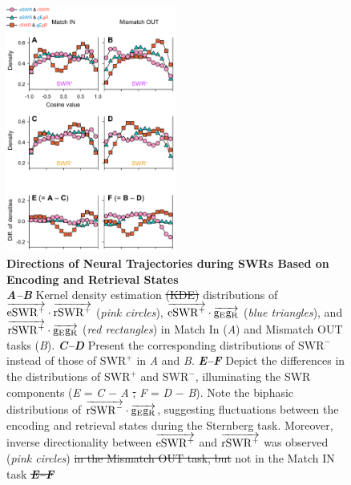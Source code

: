 \documentclass[final,3p,times,twocolumn]{elsarticle}
\providecommand{\DIFaddtex}[1]{{\protect\color{blue}\uwave{#1}}} %
\providecommand{\DIFdeltex}[1]{{\protect\color{red}\sout{#1}}}                      %
\providecommand{\DIFaddFL}[1]{\DIFadd{#1}} %
\providecommand{\DIFdelFL}[1]{\DIFdel{#1}} %
\providecommand{\DIFaddbeginFL}{} %
\providecommand{\DIFaddendFL}{} %
\providecommand{\DIFdelbeginFL}{} %
\providecommand{\DIFdelendFL}{} %
\providecommand{\DIFadd}[1]{\texorpdfstring{\DIFaddtex{#1}}{#1}} %
\providecommand{\DIFdel}[1]{\texorpdfstring{\DIFdeltex{#1}}{}} %
\newcommand{\DIFscaledelfig}{0.5}
\newlength{\DIFdelgraphicswidth} %
\newlength{\DIFdelgraphicsheight} %
\newcommand{\DIFaddincludegraphics}[2][]{{\color{blue}\fbox{\DIFOincludegraphics[#1]{#2}}}} %
\newcommand{\DIFdelincludegraphics}[2][]{%
\sbox{\DIFdelgraphicsbox}{\DIFOincludegraphics[#1]{#2}}%
\settoboxwidth{\DIFdelgraphicswidth}{\DIFdelgraphicsbox} %
\settoboxtotalheight{\DIFdelgraphicsheight}{\DIFdelgraphicsbox} %
\scalebox{\DIFscaledelfig}{%
\parbox[b]{\DIFdelgraphicswidth}{\usebox{\DIFdelgraphicsbox}\\[-\baselineskip] \rule{\DIFdelgraphicswidth}{0em}}\llap{\resizebox{\DIFdelgraphicswidth}{\DIFdelgraphicsheight}{%
\setlength{\unitlength}{\DIFdelgraphicswidth}%
\begin{picture}(1,1)%
\thicklines\linethickness{2pt} %
{\color[rgb]{1,0,0}\put(0,0){\framebox(1,1){}}}%
{\color[rgb]{1,0,0}\put(0,0){\line( 1,1){1}}}%
{\color[rgb]{1,0,0}\put(0,1){\line(1,-1){1}}}%
\end{picture}%
}\hspace*{3pt}}} %
} %
\DeclareRobustCommand{\DIFaddbeginFL}{\DIFOaddbeginFL \let\includegraphics\DIFaddincludegraphics} %
\DeclareRobustCommand{\DIFaddendFL}{\DIFOaddendFL \let\includegraphics\DIFOincludegraphics} %
\DeclareRobustCommand{\DIFdelbeginFL}{\DIFOdelbeginFL \let\includegraphics\DIFdelincludegraphics} %
\DeclareRobustCommand{\DIFdelendFL}{\DIFOaddendFL \let\includegraphics\DIFOincludegraphics} %
\begin{document}
        \clearpage
        \begin{figure}[ht]
        	\centering
            \includegraphics[width=0.5\textwidth]{./src/figures/.png/Figure_ID_07.png}
        	\caption{\textbf{
Directions of Neural Trajectories during SWRs Based on Encoding and Retrieval States
}
\smallskip
\\
\textbf{\textit{A--B}} Kernel density estimation \DIFdelbeginFL \DIFdelFL{(KDE) }\DIFdelendFL distributions of $\protect\overrightarrow{{\mathrm{eSWR^+}}} \cdot \protect\overrightarrow{{\mathrm{rSWR^+}}}$ (\textit{pink circles}), $\protect\overrightarrow{{\mathrm{eSWR^+}}} \cdot \protect\overrightarrow{{\mathrm{g_{E}g_{R}}}}$ (\textit{blue triangles}), and $\protect\overrightarrow{{\mathrm{rSWR^+}}} \cdot \protect\overrightarrow{{\mathrm{g_{E}g_{R}}}}$ (\textit{red rectangles}) in Match In (\textit{A}) and Mismatch OUT tasks (\textit{B}). \textbf{\textit{C--D}} Present the corresponding distributions of $\mathrm{SWR^-}$ instead of those of $\mathrm{SWR^+}$ in \textit{A} and \textit{B}. \textbf{\textit{E--F}} Depict the differences in the distributions of $\mathrm{SWR^+}$ and $\mathrm{SWR^-}$, illuminating the SWR components (\textit{E} = \textit{C} $-$ \textit{A} \DIFdelbeginFL \DIFdelFL{; }\DIFdelendFL \DIFaddbeginFL \DIFaddFL{\& }\DIFaddendFL \textit{F} = \textit{D} $-$ \textit{B}). Note the biphasic distributions of $\protect\overrightarrow{{\mathrm{rSWR^-}}} \cdot \protect\overrightarrow{{\mathrm{g_{E}g_{R}}}}$, suggesting fluctuations between the encoding and retrieval states during the Sternberg task. Moreover, inverse directionality between $\protect\overrightarrow{{\mathrm{eSWR^+}}}$ and $\protect\overrightarrow{{\mathrm{rSWR^+}}}$ was observed (\textit{pink circles}) \DIFdelbeginFL \DIFdelFL{in the Mismatch OUT task, but }\DIFdelendFL not in the Match IN task \DIFdelbeginFL \textbf{\textit{\DIFdelFL{E--F}}%
}}
\end{figure}
\end{document}
